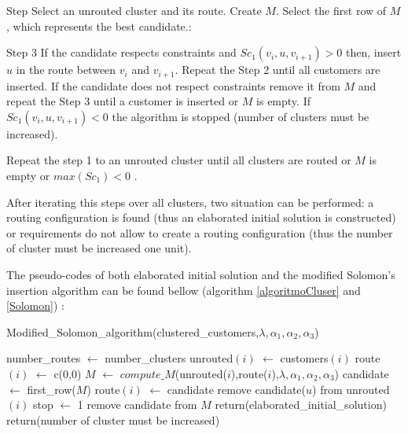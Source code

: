\begin{framed}
	\begin{steps}{Step}
		\step Select an unrouted cluster and its route.
		\step Create $M$.
		\step Select the first row of $M$, which represents the best candidate.:
		\begin{steps}{Step 3}
			\step If the candidate respects constraints and $Sc_{1}(v_i, u, v_{i+1}) > 0$ then, insert $u$ in the route between $v_i$ and $v_{i+1}$. Repeat the Step 2 until all customers are inserted.
			\step If the candidate does not respect constraints remove it from $M$ and repeat the Step 3 until a customer is inserted or $M$ is empty.
			\step If $Sc_{1}(v_i, u, v_{i+1}) < 0$ the algorithm is stopped (number of clusters must be increased).
		\end{steps}
		\step Repeat the step 1 to an unrouted cluster until all clusters are routed or $M$ is empty or $max(Sc_{1}) < 0$ .
	\end{steps}
\end{framed}

After iterating this steps over all clusters, two situation can be performed: a routing configuration is found (thus an elaborated initial solution is constructed) or requirements do not allow to create a routing configuration (thus the number of cluster must be increased one unit).

The pseudo-codes of both elaborated initial solution and the modified Solomon's insertion algorithm can be found bellow (algorithm \ref{algoritmoCluser} and \ref{Solomon}) :

\begin{algorithm}[H]
	\caption{Modified\_Solomon\_algorithm(clustered\_customers,$\lambda,\alpha_{1},\alpha_{2},\alpha_{3}$)}
	\label{Solomon}
	\begin{algorithmic}[1]
		\STATE number\_routes $\leftarrow$ number\_clusters																	  
		\STATE unrouted$(i)$  $\leftarrow$  customers$(i)$
		\STATE route$(i)$  $\leftarrow$  c(0,0)
		\ENDFOR
		\STATE  $M$ $\leftarrow$  $compute\_M$(unrouted($i$),route($i$),$\lambda,\alpha_{1},\alpha_{2},\alpha_{3} $)
		\STATE candidate  $\leftarrow$ first\_row($M$)
		\STATE route$(i)$  $\leftarrow$ candidate
		\STATE remove candidate($u$) from unrouted$(i)$
		\STATE stop  $\leftarrow$ 1
		\ELSE
		\STATE remove candidate from $M$							
		\ENDIF			
		\ENDWHILE	
		\ENDWHILE	
		\ENDFOR
		\STATE return(elaborated\_initial\_solution)
		\ELSE 
		\STATE return(number of cluster must be increased)
		\ENDIF		
	\end{algorithmic}
\end{algorithm}



